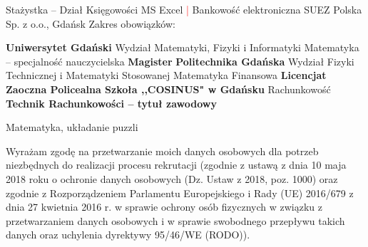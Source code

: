 \documentclass{cvClass} %
\begin{document}
   {
      \experience
        {Stażystka -- Dział Księgowości}
        {MS Excel \textcolor{red}{|} Bankowość elektroniczna}
        {SUEZ Polska Sp. z o.o., Gdańsk}
        {}
        {Zakres obowiązków:} {
        }
    }

     {
      \educationPL
        {\bf Uniwersytet Gdański}
        {Wydział Matematyki, Fizyki i Informatyki}
        {Matematyka -- specjalność nauczycielska}
        {\bf Magister}
    }
     {
      \educationPL
        {\bf Politechnika Gdańska}
        {Wydział Fizyki Technicznej i Matematyki Stosowanej}
        {Matematyka Finansowa}
        {\bf Licencjat}
    }
     {
      \educationPL
        {\bf Zaoczna Policealna Szkoła ,,COSINUS" w Gdańsku}
        {}
        {Rachunkowość}
        {\bf Technik Rachunkowości -- tytuł zawodowy}
    }


   {Matematyka, układanie puzzli}

  \vfill
    {Wyrażam zgodę na przetwarzanie moich danych osobowych dla potrzeb niezbędnych do realizacji procesu rekrutacji (zgodnie z ustawą z dnia 10 maja 2018 roku o ochronie danych osobowych (Dz. Ustaw z 2018, poz. 1000) oraz zgodnie z Rozporządzeniem Parlamentu Europejskiego i Rady (UE) 2016/679 z dnia 27 kwietnia 2016 r. w sprawie ochrony osób fizycznych w związku z przetwarzaniem danych osobowych i w sprawie swobodnego przepływu takich danych oraz uchylenia dyrektywy 95/46/WE (RODO)).}
\end{document}
